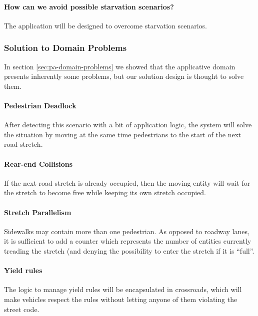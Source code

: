 \paragraph{How can we avoid possible starvation scenarios?} The application
will be designed to overcome starvation scenarios.

\subsubsection{Solution to Domain Problems}

In section \ref{sec:pa-domain-problems} we showed that the applicative domain
presents inherently some problems, but our solution design is thought to solve
them.

\paragraph{Pedestrian Deadlock} After detecting this scenario with a bit of
application logic, the system will solve the situation by moving at the same
time pedestrians to the start of the next road stretch.

\paragraph{Rear-end Collisions} If the next road stretch is already occupied,
then the moving entity will wait for the stretch to become free while keeping
its own stretch occupied.

\paragraph{Stretch Parallelism} Sidewalks may contain more than one pedestrian.
As opposed to roadway lanes, it is sufficient to add a counter which represents
the number of entities currently treading the stretch (and denying the
possibility to enter the stretch if it is ``full''.

\paragraph{Yield rules} The logic to manage yield rules will be encapsulated in
crossroads, which will make vehicles respect the rules without letting anyone of
them violating the street code.
